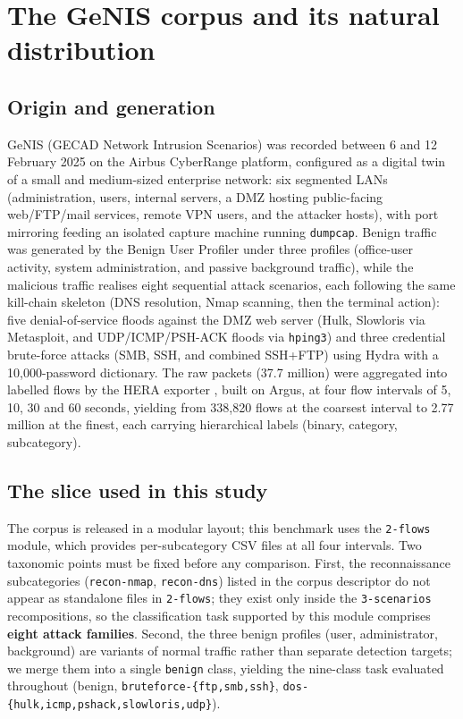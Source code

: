 \documentclass[review,12pt]{elsarticle}
\begin{document}
\section{The GeNIS corpus and its natural distribution}
\label{sec:corpus}

\subsection{Origin and generation}
GeNIS (GECAD Network Intrusion Scenarios) \cite{silva2025genis} was recorded
between 6 and 12 February 2025 on the Airbus CyberRange platform, configured
as a digital twin of a small and medium-sized enterprise network: six
segmented LANs (administration, users, internal servers, a DMZ hosting
public-facing web/FTP/mail services, remote VPN users, and the attacker
hosts), with port mirroring feeding an isolated capture machine running
\texttt{dumpcap}. Benign traffic was generated by the Benign User Profiler
\cite{shafi2024bup} under three profiles (office-user activity, system
administration, and passive background traffic), while the malicious
traffic realises eight sequential attack scenarios, each following the same
kill-chain skeleton (DNS resolution, Nmap scanning, then the terminal
action): five denial-of-service floods against the DMZ web server (Hulk,
Slowloris via Metasploit, and UDP/ICMP/PSH-ACK floods via
\texttt{hping3}) and three credential brute-force attacks (SMB, SSH, and
combined SSH+FTP) using Hydra with a 10,000-password dictionary. The raw
packets (37.7 million) were aggregated into labelled flows by the HERA
exporter \cite{pinto2024hera}, built on Argus, at four flow intervals of
5, 10, 30 and 60 seconds, yielding from 338{,}820 flows at the coarsest interval to
2.77 million at the finest, each carrying hierarchical labels (binary, category,
subcategory).

\subsection{The slice used in this study}
The corpus is released in a modular layout; this benchmark uses the
\texttt{2-flows} module, which provides per-subcategory CSV files at all
four intervals. Two taxonomic points must be fixed before any comparison.
First, the reconnaissance subcategories (\texttt{recon-nmap},
\texttt{recon-dns}) listed in the corpus descriptor do not appear as
standalone files in \texttt{2-flows}; they exist only inside the
\texttt{3-scenarios} recompositions, so the classification task supported
by this module comprises \textbf{eight attack families}. Second, the three
benign profiles (user, administrator, background) are variants of normal
traffic rather than separate detection targets; we merge them into a single
\texttt{benign} class, yielding the nine-class task evaluated throughout
(benign, \texttt{bruteforce-\{ftp,smb,ssh\}},
\texttt{dos-\{hulk,icmp,pshack,slowloris,udp\}}).
\end{document}
